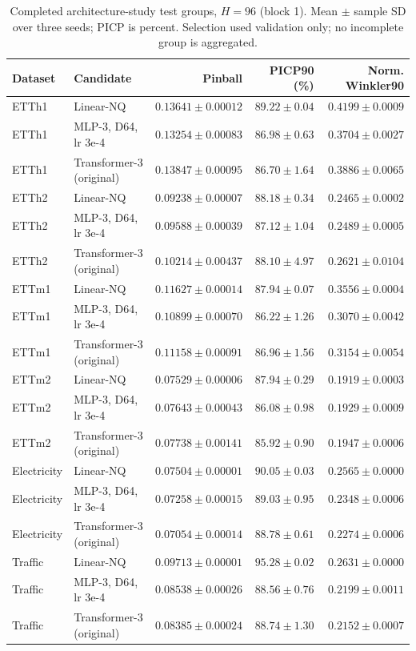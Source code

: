 \begin{table}[t]
\centering\small
\caption{Completed architecture-study test groups, $H=96$ (block 1). Mean $\pm$ sample SD over three seeds; PICP is percent. Selection used validation only; no incomplete group is aggregated.}
\label{tab:architecture-test-96-0}
\begin{tabular}{@{}llrrr@{}}
\toprule
Dataset & Candidate & Pinball & PICP90 (\%) & Norm. Winkler90 \\
\midrule
ETTh1 & Linear-NQ & $0.13641\pm0.00012$ & $89.22\pm0.04$ & $0.4199\pm0.0009$ \\
ETTh1 & MLP-3, D64, lr 3e-4 & $0.13254\pm0.00083$ & $86.98\pm0.63$ & $0.3704\pm0.0027$ \\
ETTh1 & Transformer-3 (original) & $0.13847\pm0.00095$ & $86.70\pm1.64$ & $0.3886\pm0.0065$ \\
ETTh2 & Linear-NQ & $0.09238\pm0.00007$ & $88.18\pm0.34$ & $0.2465\pm0.0002$ \\
ETTh2 & MLP-3, D64, lr 3e-4 & $0.09588\pm0.00039$ & $87.12\pm1.04$ & $0.2489\pm0.0005$ \\
ETTh2 & Transformer-3 (original) & $0.10214\pm0.00437$ & $88.10\pm4.97$ & $0.2621\pm0.0104$ \\
ETTm1 & Linear-NQ & $0.11627\pm0.00014$ & $87.94\pm0.07$ & $0.3556\pm0.0004$ \\
ETTm1 & MLP-3, D64, lr 3e-4 & $0.10899\pm0.00070$ & $86.22\pm1.26$ & $0.3070\pm0.0042$ \\
ETTm1 & Transformer-3 (original) & $0.11158\pm0.00091$ & $86.96\pm1.56$ & $0.3154\pm0.0054$ \\
ETTm2 & Linear-NQ & $0.07529\pm0.00006$ & $87.94\pm0.29$ & $0.1919\pm0.0003$ \\
ETTm2 & MLP-3, D64, lr 3e-4 & $0.07643\pm0.00043$ & $86.08\pm0.98$ & $0.1929\pm0.0009$ \\
ETTm2 & Transformer-3 (original) & $0.07738\pm0.00141$ & $85.92\pm0.90$ & $0.1947\pm0.0006$ \\
Electricity & Linear-NQ & $0.07504\pm0.00001$ & $90.05\pm0.03$ & $0.2565\pm0.0000$ \\
Electricity & MLP-3, D64, lr 3e-4 & $0.07258\pm0.00015$ & $89.03\pm0.95$ & $0.2348\pm0.0006$ \\
Electricity & Transformer-3 (original) & $0.07054\pm0.00014$ & $88.78\pm0.61$ & $0.2274\pm0.0006$ \\
Traffic & Linear-NQ & $0.09713\pm0.00001$ & $95.28\pm0.02$ & $0.2631\pm0.0000$ \\
Traffic & MLP-3, D64, lr 3e-4 & $0.08538\pm0.00026$ & $88.56\pm0.76$ & $0.2199\pm0.0011$ \\
Traffic & Transformer-3 (original) & $0.08385\pm0.00024$ & $88.74\pm1.30$ & $0.2152\pm0.0007$ \\
\bottomrule
\end{tabular}
\end{table}


